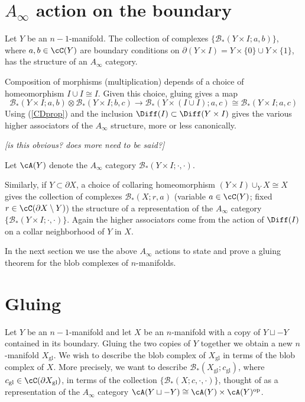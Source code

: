 \documentclass[11pt,leqno]{amsart}
\def\bc{{\mathcal B}}
\def\du{\sqcup}
\def\bd{\partial}
\def\sub{\subset}
\def\setmin{\setminus}
\def\sgl{_\mathrm{gl}}
\def\op{^\mathrm{op}}
\def\nn#1{{{\it \small [#1]}}}
\newcommand{\eq}[1]{\begin{displaymath}#1\end{displaymath}}
\begin{document}



\section{$A_\infty$ action on the boundary}

Let $Y$ be an $n{-}1$-manifold.
The collection of complexes $\{\bc_*(Y\times I; a, b)\}$, where $a, b \in \cC(Y)$ are boundary
conditions on $\bd(Y\times I) = Y\times \{0\} \cup Y\times\{1\}$, has the structure
of an $A_\infty$ category.

Composition of morphisms (multiplication) depends of a choice of homeomorphism
$I\cup I \cong I$.  Given this choice, gluing gives a map
\eq{
    \bc_*(Y\times I; a, b) \otimes \bc_*(Y\times I; b, c) \to \bc_*(Y\times (I\cup I); a, c)
            \cong \bc_*(Y\times I; a, c)
}
Using (\ref{CDprop}) and the inclusion $\Diff(I) \sub \Diff(Y\times I)$ gives the various
higher associators of the $A_\infty$ structure, more or less canonically.

\nn{is this obvious?  does more need to be said?}

Let $\cA(Y)$ denote the $A_\infty$ category $\bc_*(Y\times I; \cdot, \cdot)$.

Similarly, if $Y \sub \bd X$, a choice of collaring homeomorphism
$(Y\times I) \cup_Y X \cong X$ gives the collection of complexes $\bc_*(X; r, a)$
(variable $a \in \cC(Y)$; fixed $r \in \cC(\bd X \setmin Y)$) the structure of a representation of the
$A_\infty$ category $\{\bc_*(Y\times I; \cdot, \cdot)\}$.
Again the higher associators come from the action of $\Diff(I)$ on a collar neighborhood
of $Y$ in $X$.

In the next section we use the above $A_\infty$ actions to state and prove
a gluing theorem for the blob complexes of $n$-manifolds.







\section{Gluing}  \label{gluesect}

Let $Y$ be an $n{-}1$-manifold and let $X$ be an $n$-manifold with a copy
of $Y \du -Y$ contained in its boundary.
Gluing the two copies of $Y$ together we obtain a new $n$-manifold $X\sgl$.
We wish to describe the blob complex of $X\sgl$ in terms of the blob complex
of $X$.
More precisely, we want to describe $\bc_*(X\sgl; c\sgl)$,
where $c\sgl \in \cC(\bd X\sgl)$,
in terms of the collection $\{\bc_*(X; c, \cdot, \cdot)\}$, thought of as a representation
of the $A_\infty$ category $\cA(Y\du-Y) \cong \cA(Y)\times \cA(Y)\op$.
\end{document}
